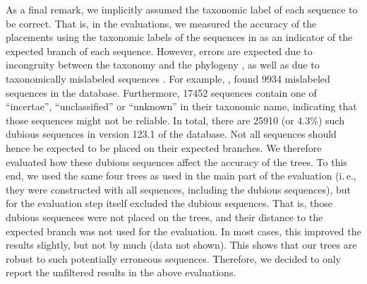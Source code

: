 As a final remark, we implicitly assumed the taxonomic label of each sequence to be correct.
That is, in the evaluations, we measured the accuracy of the placements
using the taxonomic labels of the sequences in  as an indicator of the expected branch of each sequence.
However, errors are expected due to incongruity between the taxonomy and the phylogeny \citep{Moreira2000},
as well as due to taxonomically mislabeled sequences \citep{Kozlov2016}.
For example,  \citep{Kozlov2016},
found \num{9 934} mislabeled sequences in the  database.
Furthermore, \num{17 452} sequences contain one of ``incertae'', ``unclassified'' or ``unknown'' in their taxonomic name,
indicating that those sequences might not be reliable.
In total, there are \num{25 910} (or \num{4.3}\%) such dubious sequences in version 123.1 of the  database.
Not all sequences should hence be expected to be placed on their expected branches.
We therefore evaluated how these dubious sequences affect the accuracy of the trees.
To this end, we used the same four trees as used in the main part of the evaluation
(i.\,e., they were constructed with all sequences, including the dubious sequences),
but for the evaluation step itself excluded the dubious sequences.
That is, those dubious sequences were not placed on the trees,
and their distance to the expected branch was not used for the evaluation.
In most cases, this improved the results slightly, but not by much (data not shown).
This shows that our trees are robust to such potentially erroneous sequences.
Therefore, we decided to only report the unfiltered results in the above evaluations.


